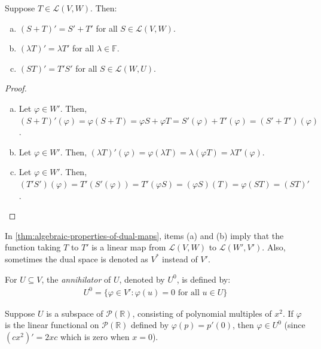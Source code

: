 \documentclass{article}
\begin{document}
\begin{theorem}
  \label{thm:algebraic-properties-of-dual-maps}
  Suppose $T \in \mathcal{L}(V, W)$. Then:
  \begin{enumerate}[(a)]
  \item $(S + T)' = S' + T'$ for all $S \in \mathcal{L}(V, W)$.
  \item $(\lambda T)' = \lambda T'$ for all $\lambda \in \mathbb{F}$.
  \item $(ST)' = T'S'$ for all $S \in \mathcal{L}(W, U)$.
  \end{enumerate}
\end{theorem}
\begin{proof}
  \leavevmode
  \begin{enumerate}[(a)]
  \item Let $\varphi \in W'$. Then, $(S + T)'(\varphi) = \varphi(S + T) = \varphi S
    + \varphi T = S'(\varphi) + T'(\varphi) = (S' + T')(\varphi)$.
  \item Let $\varphi \in W'$. Then, $(\lambda T)'(\varphi) =
    \varphi(\lambda T) = \lambda (\varphi T) = \lambda T'(\varphi)$.
  \item Let $\varphi \in W'$. Then, $(T'S')(\varphi) = T'(S'(\varphi))
    = T'(\varphi S) = (\varphi S)(T) = \varphi(ST) = (ST)'$.

  \end{enumerate}
\end{proof}

\begin{remark}
  In \cref{thm:algebraic-properties-of-dual-maps}, items (a) and (b)
  imply that the function taking $T$ to $T'$ is a linear map from
  $\mathcal{L}(V, W)$ to $\mathcal{L}(W', V')$. Also, sometimes the
  dual space is denoted as $V^{*}$ instead of $V'$.
\end{remark}

\begin{definition}[annihilator]
  For $U \subseteq V$, the \textit{annihilator} of $U$, denoted by
  $U^0$, is defined by:
  \begin{align*}
    U^0 = \{\varphi \in V': \varphi(u) = 0 \text{ for all } u \in U\}
  \end{align*}
\end{definition}

\begin{example}
  Suppose $U$ is a subspace of $\mathcal{P}(\mathbb{R})$, consisting
  of polynomial multiples of $x^2$. If $\varphi$ is the linear
  functional on $\mathcal{P}(\mathbb{R})$ defined by $\varphi(p) =
  p'(0)$, then $\varphi \in U^0$ (since $(cx^2)' = 2xc$ which is zero
  when $x = 0$).
\end{example}
\end{document}
